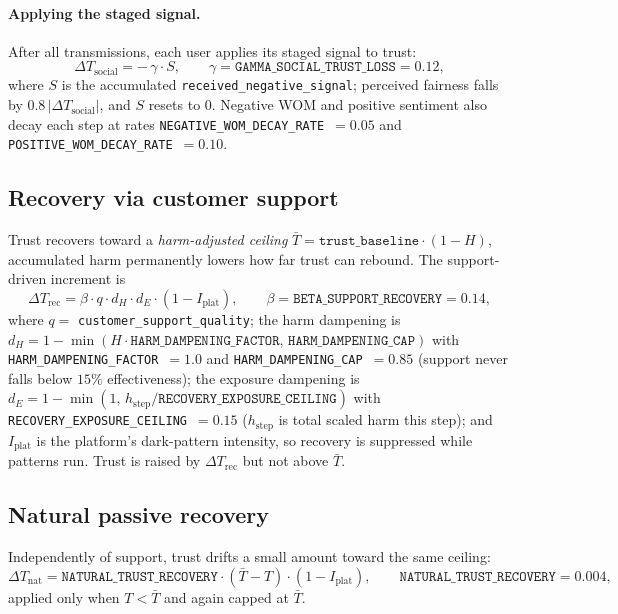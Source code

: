 \documentclass[11pt]{article}
\newcommand{\code}[1]{\texttt{#1}}
\begin{document}
\paragraph{Applying the staged signal.}
After all transmissions, each user applies its staged signal to trust:
\[
\Delta T_{\text{social}} = -\,\gamma \cdot S,
\qquad \gamma = \code{GAMMA\_SOCIAL\_TRUST\_LOSS} = 0.12,
\]
where $S$ is the accumulated \code{received\_negative\_signal}; perceived fairness
falls by $0.8\,|\Delta T_{\text{social}}|$, and $S$ resets to $0$. Negative WOM
and positive sentiment also decay each step at rates
\code{NEGATIVE\_WOM\_DECAY\_RATE}~$=0.05$ and
\code{POSITIVE\_WOM\_DECAY\_RATE}~$=0.10$.

\subsection{Recovery via customer support}
\label{sub:recovery}

Trust recovers toward a \emph{harm-adjusted ceiling}
$\bar T = \code{trust\_baseline}\cdot(1-H)$, accumulated harm permanently lowers
how far trust can rebound. The support-driven increment is
\[
\Delta T_{\text{rec}} = \beta \cdot q \cdot d_H \cdot d_E \cdot (1 - I_{\text{plat}}),
\qquad \beta = \code{BETA\_SUPPORT\_RECOVERY} = 0.14,
\]
where $q = $ \code{customer\_support\_quality}; the harm dampening is
$d_H = 1 - \min(H\cdot\code{HARM\_DAMPENING\_FACTOR},\,\code{HARM\_DAMPENING\_CAP})$
with \code{HARM\_DAMPENING\_FACTOR}~$=1.0$ and \code{HARM\_DAMPENING\_CAP}~$=0.85$
(support never falls below $15\%$ effectiveness); the exposure dampening is
$d_E = 1 - \min(1,\, h_{\text{step}}/\code{RECOVERY\_EXPOSURE\_CEILING})$ with
\code{RECOVERY\_EXPOSURE\_CEILING}~$=0.15$ ($h_{\text{step}}$ is total scaled harm
this step); and $I_{\text{plat}}$ is the platform's dark-pattern intensity, so
recovery is suppressed while patterns run. Trust is raised by
$\Delta T_{\text{rec}}$ but not above $\bar T$.

\subsection{Natural passive recovery}
\label{sub:natrecovery}

Independently of support, trust drifts a small amount toward the same ceiling:
\[
\Delta T_{\text{nat}} = \code{NATURAL\_TRUST\_RECOVERY}\cdot(\bar T - T)\cdot(1 - I_{\text{plat}}),
\qquad \code{NATURAL\_TRUST\_RECOVERY}=0.004,
\]
applied only when $T < \bar T$ and again capped at $\bar T$.
\end{document}
